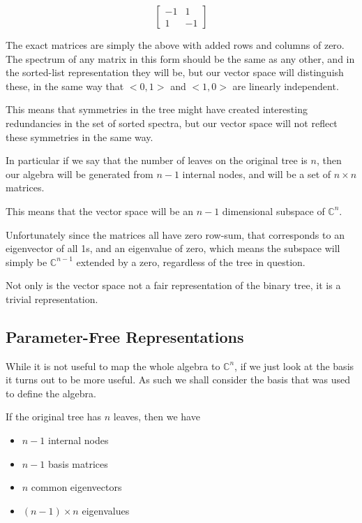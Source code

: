 \documentclass{report}
\begin{document}
\[
	\left[ \begin{matrix}
		-1 & 1\\
		1 & -1
	\end{matrix} \right]
\]

The exact matrices are simply the above with added rows and columns of zero.
The spectrum of any matrix in this form should be the same as any other, and in
the sorted-list representation they will be, but our vector space will
distinguish these, in the same way that $<0, 1>$ and $<1, 0>$ are linearly
independent.

This means that symmetries in the tree might have created interesting
redundancies in the set of sorted spectra, but our vector space will not
reflect these symmetries in the same way.

In particular if we say that the number of leaves on the original tree is $n$,
then our algebra will be generated from $n-1$ internal nodes, and will be a set
of $n \times n$ matrices.

This means that the vector space will be an $n-1$ dimensional subspace of
$\mathds{C}^n$.

Unfortunately since the matrices all have zero row-sum, that corresponds to an
eigenvector of all 1s, and an eigenvalue of zero, which means the subspace will
simply be $\mathds{C}^{n-1}$ extended by a zero, regardless of the tree in
question.

Not only is the vector space not a fair representation of the binary tree, it
is a trivial representation.

\subsection{Parameter-Free Representations}

While it is not useful to map the whole algebra to $\mathds{C}^n$, if we just
look at the basis it turns out to be more useful.
As such we shall consider the basis that was used to define the algebra.

If the original tree has $n$ leaves, then we have
\begin{itemize}
	\item $n-1$ internal nodes
	\item $n-1$ basis matrices
	\item $n$ common eigenvectors
	\item $(n-1) \times n$ eigenvalues
\end{itemize}
\end{document}
